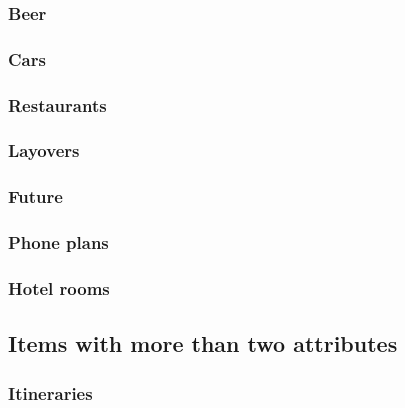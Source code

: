 \documentclass[11pt,letter]{article}
\begin{document}
\subsubsection{Beer}



\subsubsection{Cars}



\subsubsection{Restaurants}



\subsubsection{Layovers}



\subsubsection{Future}



\subsubsection{Phone plans}



\subsubsection{Hotel rooms}



\subsection{Items with more than two attributes}

\subsubsection{Itineraries}


\end{document}
